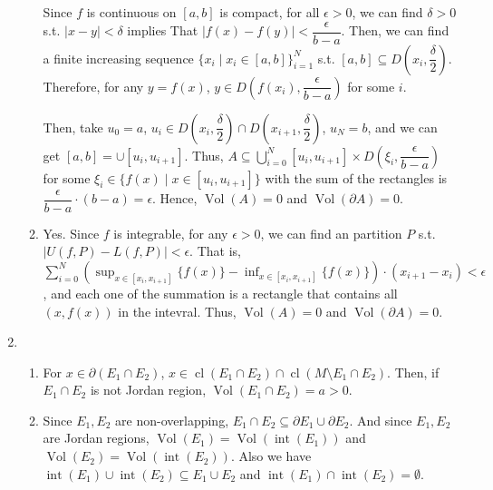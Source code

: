 \documentclass[12pt]{article}
\DeclareMathOperator{\volume}{Vol}
\DeclareMathOperator{\interior}{int}
\DeclareMathOperator{\closure}{cl}
\newcommand{\boundary}{\partial}
\begin{document}
\begin{enumerate}
\begin{enumerate}
        Since $f$ is continuous on $[a, b]$ is compact, for all $\epsilon > 0$, we can find $\delta > 0$ s.t. $|x-y| < \delta$ implies That $|f(x) - f(y)| < \dfrac{\epsilon}{b-a}$.
        Then, we can find a finite increasing sequence $\{x_i \mid x_i \in [a, b]\}_{i=1}^N$ s.t. $[a, b] \subseteq D(x_i, \dfrac{\delta}{2})$.
        Therefore, for any $y = f(x)$, $y \in D(f(x_i), \dfrac{\epsilon}{b-a})$ for some $i$.

        Then, take $u_0 = a$, $u_i \in D(x_i, \dfrac{\delta}{2})\cap D(x_{i+1}, \dfrac{\delta}{2})$, $u_N = b$,
        and we can get $[a, b] = \cup [u_i, u_{i+1}]$.
        Thus, $A \subseteq \displaystyle\bigcup_{i=0}^N [u_i, u_{i+1}] \times D(\xi_i, \dfrac{\epsilon}{b-a})$ for some $\xi_i \in \{ f(x)\mid x\in [u_i, u_{i+1}]\}$
        with the sum of the rectangles is $\dfrac{\epsilon}{b-a} \cdot (b-a) = \epsilon$.
        Hence, $\volume(A) = 0$ and $\volume(\boundary A) = 0$.

        \item Yes. Since $f$ is integrable, for any $\epsilon > 0$, 
        we can find an partition $P$ s.t. $|U(f, P) - L(f, P)|< \epsilon$.
        That is, $\displaystyle\sum_{i=0}^{N} (\displaystyle\sup_{x\in [x_i, x_{i+1}]}\{f(x)\} - \displaystyle\inf_{x\in [x_i, x_{i+1}]}\{f(x)\}) \cdot (x_{i+1} - x_i) < \epsilon$,
        and each one of the summation is a rectangle that contains all $(x, f(x))$ in the intevral.
        Thus, $\volume(A) = 0$ and $\volume(\boundary A) = 0$.
    \end{enumerate}

    \item \begin{enumerate}
        \item For $x \in \boundary (E_1 \cap E_2)$, $x\in \closure(E_1 \cap E_2) \cap \closure(M\setminus E_1 \cap E_2)$.
        Then, if $E_1 \cap E_2$ is not Jordan region, $\volume(E_1\cap E_2) = a > 0$.
    
        \item Since $E_1, E_2$ are non-overlapping, $E_1 \cap E_2 \subseteq \boundary E_1 \cup \boundary E_2$.
        And since $E_1, E_2$ are Jordan regions, $\volume(E_1) = \volume(\interior(E_1))$ and $\volume(E_2) = \volume(\interior(E_2))$.
        Also we have $\interior(E_1) \cup \interior(E_2) \subseteq E_1 \cup E_2$ and $\interior(E_1) \cap \interior(E_2) = \emptyset$.


\end{enumerate}
\end{enumerate}
\end{document}
